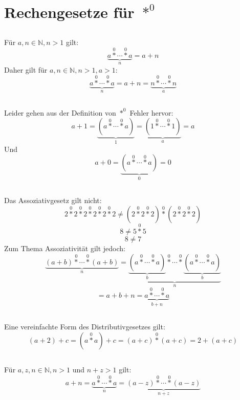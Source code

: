 \documentclass{article}
\begin{document}
\section{Rechengesetze f\"ur $\operatorname*{\ast}^0$\newline}

\subsection{}
F\"ur $a, n \in \mathbb{N}, n > 1$ gilt:
\[ \underbrace{a \operatorname*{\ast}^0 \dotsb \operatorname*{\ast}^0 a}_n = a+n \]
Daher gilt f\"ur $a, n \in \mathbb{N}, n > 1, a > 1$:
\[ \underbrace{a \operatorname*{\ast}^0 \dotsb \operatorname*{\ast}^0 a}_n =
   a+n = \underbrace{n \operatorname*{\ast}^0 \dotsb \operatorname*{\ast}^0 n}_a \]
\subsection{}
Leider gehen aus der Definition von $\operatorname*{\ast}^0$ Fehler hervor:
\[ a+1 = \underbrace{\left(a\operatorname*{\ast}^0 \dotsb \operatorname*{\ast}^0 a\right) }_1 =
  \underbrace{\left(1\operatorname*{\ast}^0 \dotsb \operatorname*{\ast}^0 1\right) }_a = a \]
Und
\[ a+0 = \underbrace{\left(a\operatorname*{\ast}^0 \dotsb \operatorname*{\ast}^0 a\right) }_0 = 0 \]
\subsection{}
	Das Assoziativgesetz gilt nicht:
\[ 2 \operatorname*{\ast}^0 2 \operatorname*{\ast}^0 2 \operatorname*{\ast}^0 2 \operatorname*{\ast}^0 2 \operatorname*{\ast}^0 2 \neq
   \left(2 \operatorname*{\ast}^0 2 \operatorname*{\ast}^0 2\right) \operatorname*{\ast}^0 \left(2 \operatorname*{\ast}^0 2 \operatorname*{\ast}^0 2\right) \]
\[ 8 \neq 5 \operatorname*{\ast}^0 5 \]
\[ 8 \neq 7 \]
	Zum Thema Assoziativit\"at gilt jedoch:
\[  \underbrace{\left(a+b\right)\operatorname*{\ast}^0 \dotsb \operatorname*{\ast}^0 \left(a+b\right)}_n =
    \underbrace{\underbrace{\left(a\operatorname*{\ast}^0 \dotsb\operatorname*{\ast}^0 a\right)}_b \operatorname*{\ast}^0 \dotsb \operatorname*{\ast}^0\underbrace{\left(a\operatorname*{\ast}^0 \dotsb\operatorname*{\ast}^0 a\right)}_b }_n \]
\[ = a + b + n = \underbrace{a\operatorname*{\ast}^0 \dotsb \operatorname*{\ast}^0 a}_{b+n} \]
\subsection{}
	Eine vereinfachte Form des Distributivgesetzes gilt:
\[ \left(a + 2\right) + c = \left(a\operatorname*{\ast}^0a\right) + c = \left(a+c\right)\operatorname*{\ast}^0\left(a+c\right) = 2 + \left(a + c\right) \]
\subsection{}
F\"ur $a, z, n \in \mathbb{N}, n > 1$ und $n+z > 1$ gilt:
\[ a + n = \underbrace{a \operatorname*{\ast}^0 \dotsb \operatorname*{\ast}^0 a}_n =
   \underbrace{\left(a - z\right) \operatorname*{\ast}^0 \dotsb \operatorname*{\ast}^0 \left(a - z\right)}_{n+z} \]
\end{document}
